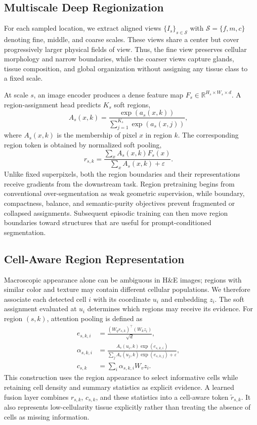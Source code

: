 \documentclass[letterpaper]{article} %
\begin{document}
\subsection{Multiscale Deep Regionization}

For each sampled location, we extract aligned views $\{I_s\}_{s\in\mathcal{S}}$ with $\mathcal{S}=\{f,m,c\}$ denoting fine, middle, and coarse scales. These views share a center but cover progressively larger physical fields of view. Thus, the fine view preserves cellular morphology and narrow boundaries, while the coarser views capture glands, tissue composition, and global organization without assigning any tissue class to a fixed scale.

At scale $s$, an image encoder produces a dense feature map $F_s\in\mathbb{R}^{H_s\times W_s\times d}$. A region-assignment head predicts $K_s$ soft regions,
\begin{equation}
    A_s(x,k)=
    \frac{\exp(a_s(x,k))}
    {\sum_{j=1}^{K_s}\exp(a_s(x,j))},
\end{equation}
where $A_s(x,k)$ is the membership of pixel $x$ in region $k$. The corresponding region token is obtained by normalized soft pooling,
\begin{equation}
    r_{s,k}=
    \frac{\sum_x A_s(x,k)F_s(x)}
    {\sum_x A_s(x,k)+\varepsilon}.
\end{equation}
Unlike fixed superpixels, both the region boundaries and their representations receive gradients from the downstream task. Region pretraining begins from conventional over-segmentation as weak geometric supervision, while boundary, compactness, balance, and semantic-purity objectives prevent fragmented or collapsed assignments. Subsequent episodic training can then move region boundaries toward structures that are useful for prompt-conditioned segmentation.

\subsection{Cell-Aware Region Representation}

Macroscopic appearance alone can be ambiguous in H\&E images; regions with similar color and texture may contain different cellular populations. We therefore associate each detected cell $i$ with its coordinate $u_i$ and embedding $z_i$. The soft assignment evaluated at $u_i$ determines which regions may receive its evidence. For region $(s,k)$, attention pooling is defined as
\begin{align}
    e_{s,k,i} & =
    \frac{(W_q r_{s,k})^{\top}(W_k z_i)}{\sqrt{d}}, \\
    \alpha_{s,k,i} & =
    \frac{A_s(u_i,k)\exp(e_{s,k,i})}
    {\sum_j A_s(u_j,k)\exp(e_{s,k,j})+\varepsilon}, \\
    c_{s,k} & = \sum_i \alpha_{s,k,i}W_v z_i.
\end{align}
This construction uses the region appearance to select informative cells while retaining cell density and summary statistics as explicit evidence. A learned fusion layer combines $r_{s,k}$, $c_{s,k}$, and these statistics into a cell-aware token $\tilde{r}_{s,k}$. It also represents low-cellularity tissue explicitly rather than treating the absence of cells as missing information.
\end{document}
